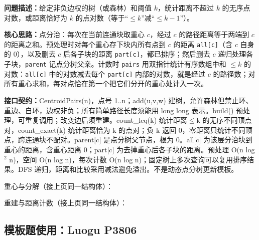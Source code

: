 \noindent\textbf{问题描述：}\allowbreak 给定非负边权的树（或森林）和阈值 $k$，统计距离不超过 $k$ 的无序点对数，或距离恰好为 $k$ 的点对数（等于“$\le k$”减“$\le k-1$”）。

\textbf{核心思路：}\allowbreak 点分治：每次在当前连通块取重心 $c$，经过 $c$ 的路径距离等于两端到 $c$ 的距离之和。预处理时对每个重心存下块内所有点到 $c$ 的距离 \texttt{all[c]}（含 $c$ 自身的 0），以及删去 $c$ 后各子块的距离 \texttt{part[c]}，都已排序；然后删去 $c$ 递归处理各子块，\texttt{parent} 记点分树父亲。计数时 \texttt{pairs} 用双指针统计有序数组中和 $\le k$ 的对数：\texttt{all[c]} 中的对数减去每个 \texttt{part[c]} 内部的对数，就是经过 $c$ 的路径数；对所有重心求和，每对点恰在第一个把它们分开的重心处计入一次。



{\sloppy{}\noindent\textbf{接口契约：}CentroidPairs(n)，点号 1..n；add(u,v,w) 建树，允许森林但禁止环、重边、自环，边权非负；所有简单路径长度须能用 long long 表示。build() 预处理，可重复调用；改变边后须重建。count\_leq(k) 统计距离$\le$k 的无序不同顶点对，count\_exact(k) 统计距离恰为 k 的点对；负 k 返回 0，零距离只统计不同顶点，跨连通块不配对。parent[c] 是点分树父节点，根为 0。all[c] 为该层分治块到重心的距离，含重心距离 0；part[c] 为去掉重心后各子块的距离。预处理 O(n log$^{2}$ n)，空间 O(n log n)，每次计数 O(n log n)；固定树上多次查询可以复用排序结果。DFS 递归，距离和比较采用减法避免溢出。不是动态点分树更新模板。\par}

\Needspace{532pt}



\newpage

\noindent 重心与分解（接上页同一结构体）：



\newpage

\noindent 重建与距离计数（接上页同一结构体）：



\Needspace{415pt}

\subsection*{模板题使用：Luogu P3806}

\label{usage-example-137}

